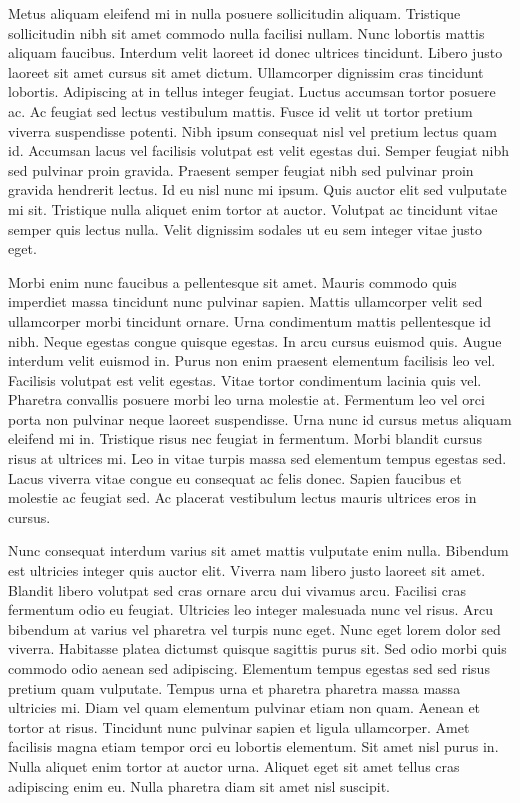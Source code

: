 \documentclass[11pt,a4paper]{article}
\begin{document}
Metus aliquam eleifend mi in nulla posuere sollicitudin aliquam. Tristique sollicitudin nibh sit amet commodo nulla facilisi nullam. Nunc lobortis mattis aliquam faucibus. Interdum velit laoreet id donec ultrices tincidunt. Libero justo laoreet sit amet cursus sit amet dictum. Ullamcorper dignissim cras tincidunt lobortis. Adipiscing at in tellus integer feugiat. Luctus accumsan tortor posuere ac. Ac feugiat sed lectus vestibulum mattis. Fusce id velit ut tortor pretium viverra suspendisse potenti. Nibh ipsum consequat nisl vel pretium lectus quam id. Accumsan lacus vel facilisis volutpat est velit egestas dui. Semper feugiat nibh sed pulvinar proin gravida. Praesent semper feugiat nibh sed pulvinar proin gravida hendrerit lectus. Id eu nisl nunc mi ipsum. Quis auctor elit sed vulputate mi sit. Tristique nulla aliquet enim tortor at auctor. Volutpat ac tincidunt vitae semper quis lectus nulla. Velit dignissim sodales ut eu sem integer vitae justo eget.

Morbi enim nunc faucibus a pellentesque sit amet. Mauris commodo quis imperdiet massa tincidunt nunc pulvinar sapien. Mattis ullamcorper velit sed ullamcorper morbi tincidunt ornare. Urna condimentum mattis pellentesque id nibh. Neque egestas congue quisque egestas. In arcu cursus euismod quis. Augue interdum velit euismod in. Purus non enim praesent elementum facilisis leo vel. Facilisis volutpat est velit egestas. Vitae tortor condimentum lacinia quis vel. Pharetra convallis posuere morbi leo urna molestie at. Fermentum leo vel orci porta non pulvinar neque laoreet suspendisse. Urna nunc id cursus metus aliquam eleifend mi in. Tristique risus nec feugiat in fermentum. Morbi blandit cursus risus at ultrices mi. Leo in vitae turpis massa sed elementum tempus egestas sed. Lacus viverra vitae congue eu consequat ac felis donec. Sapien faucibus et molestie ac feugiat sed. Ac placerat vestibulum lectus mauris ultrices eros in cursus.

Nunc consequat interdum varius sit amet mattis vulputate enim nulla. Bibendum est ultricies integer quis auctor elit. Viverra nam libero justo laoreet sit amet. Blandit libero volutpat sed cras ornare arcu dui vivamus arcu. Facilisi cras fermentum odio eu feugiat. Ultricies leo integer malesuada nunc vel risus. Arcu bibendum at varius vel pharetra vel turpis nunc eget. Nunc eget lorem dolor sed viverra. Habitasse platea dictumst quisque sagittis purus sit. Sed odio morbi quis commodo odio aenean sed adipiscing. Elementum tempus egestas sed sed risus pretium quam vulputate. Tempus urna et pharetra pharetra massa massa ultricies mi. Diam vel quam elementum pulvinar etiam non quam. Aenean et tortor at risus. Tincidunt nunc pulvinar sapien et ligula ullamcorper. Amet facilisis magna etiam tempor orci eu lobortis elementum. Sit amet nisl purus in. Nulla aliquet enim tortor at auctor urna. Aliquet eget sit amet tellus cras adipiscing enim eu. Nulla pharetra diam sit amet nisl suscipit.
\end{document}

